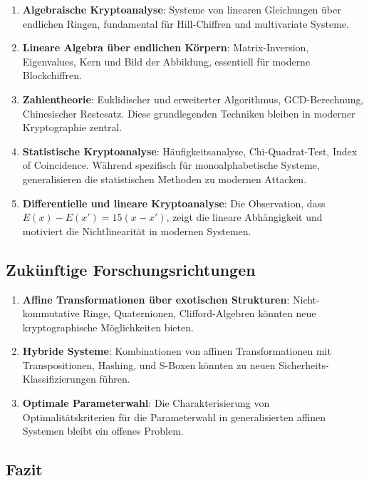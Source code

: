 ﻿\documentclass[12pt,a4paper]{article}
\begin{document}
	\begin{enumerate}
		\item \textbf{Algebraische Kryptoanalyse}: Systeme von linearen Gleichungen über endlichen Ringen, fundamental für Hill-Chiffren und multivariate Systeme.
		
		\item \textbf{Lineare Algebra über endlichen Körpern}: Matrix-Inversion, Eigenvalues, Kern und Bild der Abbildung, essentiell für moderne Blockchiffren.
		
		\item \textbf{Zahlentheorie}: Euklidischer und erweiterter Algorithmus, GCD-Berechnung, Chinesischer Restesatz. Diese grundlegenden Techniken bleiben in moderner Kryptographie zentral.
		
		\item \textbf{Statistische Kryptoanalyse}: Häufigkeitsanalyse, Chi-Quadrat-Test, Index of Coincidence. Während spezifisch für monoalphabetische Systeme, generalisieren die statistischen Methoden zu modernen Attacken.
		
		\item \textbf{Differentielle und lineare Kryptoanalyse}: Die Observation, dass $E(x) - E(x') = 15(x - x')$, zeigt die lineare Abhängigkeit und motiviert die Nichtlinearität in modernen Systemen.
	\end{enumerate}
	
	\subsection{Zukünftige Forschungsrichtungen}
	
	\begin{enumerate}
		\item \textbf{Affine Transformationen über exotischen Strukturen}: Nicht-kommutative Ringe, Quaternionen, Clifford-Algebren könnten neue kryptographische Möglichkeiten bieten.
		
		\item \textbf{Hybride Systeme}: Kombinationen von affinen Transformationen mit Transpositionen, Hashing, und S-Boxen könnten zu neuen Sicherheits-Klassifizierungen führen.
		
		\item \textbf{Optimale Parameterwahl}: Die Charakterisierung von Optimalitätskriterien für die Parameterwahl in generalisierten affinen Systemen bleibt ein offenes Problem.
	\end{enumerate}
	
	\subsection{Fazit}
	
\end{document}

